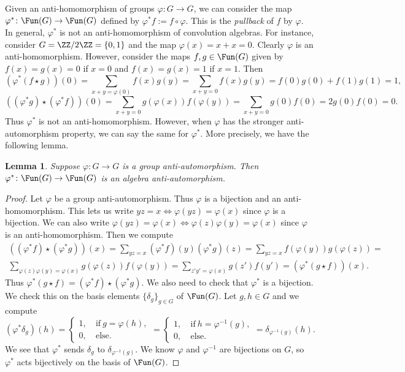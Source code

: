 \documentclass[11pt]{amsart}
\newtheorem{lem}[thm]{Lemma}
\theoremstyle{remark}
\begin{document}
Given an anti-homomorphism of groups $\varphi\colon G\to G$, we can consider the map $\varphi^\ast\colon\Fun(G)\to\Fun(G)$ defined by $\varphi^\ast f := f\circ \varphi$.
This is the \emph{pullback} of $f$ by $\varphi$.
In general, $\varphi^\ast$ is not an anti-homomorphism of convolution algebras.
For instance, consider $G=\ZZ/2\ZZ=\{0,1\}$ and the map $\varphi(x)=x+x=0$.
Clearly $\varphi$ is an anti-homomorphism.
However, consider the maps $f,g\in\Fun(G)$ given by $f(x)=g(x)=0$ if $x=0$ and $f(x)=g(x)=1$ if $x=1$.
Then
\[
	(\varphi^\ast(f\star g))(0) = \sum_{x+y = \varphi(0)} f(x)g(y) = \sum_{x+y = 0} f(x)g(y) = f(0)g(0) + f(1)g(1) = 1,
\]
\[
	((\varphi^\ast g)\star(\varphi^\ast f))(0) = \sum_{x+y = 0} g(\varphi(x))f(\varphi(y)) = \sum_{x+y = 0} g(0)f(0) = 2g(0)f(0) = 0.
\]
Thus $\varphi^\ast$ is not an anti-homomorphism.
However, when $\varphi$ has the stronger anti-automorphism property, we can say the same for $\varphi^\ast$.
More precisely, we have the following lemma.
\begin{lem}
	Suppose $\varphi\colon G\to G$ is a group anti-automorphism.
	Then $\varphi^\ast\colon\Fun(G)\to\Fun(G)$ is an algebra anti-automorphism.
\end{lem}
\begin{proof}
	Let $\varphi$ be a group anti-automorphism.
	Thus $\varphi$ is a bijection and an anti-homomorphism.
	This lets us write $yz=x \iff \varphi(yz)=\varphi(x)$ since $\varphi$ is a bijection.
	We can also write $\varphi(yz)=\varphi(x) \iff \varphi(z)\varphi(y)=\varphi(x)$ since $\varphi$ is an anti-homomorphism.
	Then we compute
	\begin{multline*}
		((\varphi^\ast f)\star(\varphi^\ast g))(x) = \sum_{yz=x} (\varphi^\ast f)(y)(\varphi^\ast g)(z) = \sum_{yz=x} f(\varphi(y)) g(\varphi(z)) = \\
		\sum_{\varphi(z)\varphi(y)=\varphi(x)} g(\varphi(z))f(\varphi(y)) = \sum_{z'y'=\varphi(x)} g(z')f(y') = (\varphi^\ast(g\star f))(x).
	\end{multline*}
	Thus $\varphi^\ast(g\star f) = (\varphi^\ast f)\star(\varphi^\ast g)$.
	We also need to check that $\varphi^\ast$ is a bijection.
	We check this on the basis elements $\{\delta_g\}_{g\in G}$ of $\Fun(G)$.
	Let $g,h\in G$ and we compute
	\[
		(\varphi^\ast\delta_g)(h) = \begin{cases}
			1,\  & \text{if}\ g=\varphi(h), \\
			0,\  & \text{else}.
		\end{cases} = \begin{cases}
			1,\  & \text{if}\ h=\varphi^{-1}(g), \\
			0,\  & \text{else}.
		\end{cases} = \delta_{\varphi^{-1}(g)}(h).
	\]
	We see that $\varphi^\ast$ sends $\delta_g$ to $\delta_{\varphi^{-1}(g)}$.
	We know $\varphi$ and $\varphi^{-1}$ are bijections on $G$, so $\varphi^\ast$ acts bijectively on the basis of $\Fun(G)$.
\end{proof}
\end{document}
